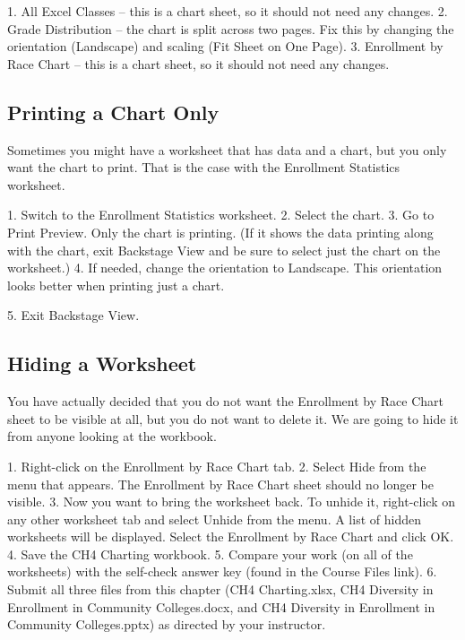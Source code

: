 1. All Excel Classes – this is a chart sheet, so it should not need any changes.
2. Grade Distribution – the chart is split across two pages. Fix this by changing the orientation
(Landscape) and scaling (Fit Sheet on One Page).
3. Enrollment by Race Chart – this is a chart sheet, so it should not need any changes.

\subsection{Printing a Chart Only}

Sometimes you might have a worksheet that has data and a chart, but you only want the chart to print.
That is the case with the Enrollment Statistics worksheet.

1. Switch to the Enrollment Statistics worksheet.
2. Select the chart.
3. Go to Print Preview. Only the chart is printing. (If it shows the data printing along with the chart,
exit Backstage View and be sure to select just the chart on the worksheet.)
4. If needed, change the orientation to Landscape. This orientation looks better when printing just
a chart.

5. Exit Backstage View.

\subsection{Hiding a Worksheet}

You have actually decided that you do not want the Enrollment by Race Chart sheet to be visible at
all, but you do not want to delete it. We are going to hide it from anyone looking at the workbook.

1. Right-click on the Enrollment by Race Chart tab.
2. Select Hide from the menu that appears. The Enrollment by Race Chart sheet should no longer
be visible.
3. Now you want to bring the worksheet back. To unhide it, right-click on any other worksheet
tab and select Unhide from the menu. A list of hidden worksheets will be displayed. Select the
Enrollment by Race Chart and click OK.
4. Save the CH4 Charting workbook.
5. Compare your work (on all of the worksheets) with the self-check answer key (found in the
Course Files link).
6. Submit all three files from this chapter (CH4 Charting.xlsx, CH4 Diversity in Enrollment in
Community Colleges.docx, and CH4 Diversity in Enrollment in Community
Colleges.pptx) as directed by your instructor.





